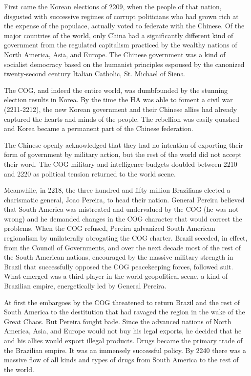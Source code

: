\documentclass[]{article}
\begin{document}
{First came the Korean elections of 2209, when the people of that nation, disgusted with successive regimes of corrupt politicians who had grown rich at the expense of the populace, actually voted to federate with the Chinese. Of the major countries of the world, only China had a significantly different kind of government from the regulated capitalism practiced by the wealthy nations of North America, Asia, and Europe. The Chinese government was a kind of socialist democracy based on the humanist principles espoused by the canonized twenty-second century Italian Catholic, St. Michael of Siena.

The COG, and indeed the entire world, was dumbfounded by the stunning election results in Korea. By the time the HA was able to foment a civil war (2211-2212), the new Korean government and their Chinese allies had already captured the hearts and minds of the people. The rebellion was easily quashed and Korea became a permanent part of the Chinese federation.

The Chinese openly acknowledged that they had no intention of exporting their form of government by military action, but the rest of the world did not accept their word. The COG military and intelligence budgets doubled between 2210 and 2220 as political tension returned to the world scene.

Meanwhile, in 2218, the three hundred and fifty million Brazilians elected a charismatic general, Joao Pereira, to head their nation. General Pereira believed that South America was mistreated and undervalued by the COG (he was not wrong) and he demanded changes in the COG character that would correct the problems. When the COG refused, Pereira galvanized South American regionalism by unilaterally abrogating the COG charter. Brazil seceded, in effect, from the Council of Governments, and over the next decade most of the rest of the South American nations, encouraged by the massive military strength in Brazil that successfully opposed the COG peacekeeping forces, followed suit. What emerged was a third player in the world geopolitical scene, a kind of Brazilian empire, energetically led by General Pereira.

At first the embargoes by the COG threatened to return Brazil and the rest of South America to the destitution that had ravaged the region in the wake of the Great Chaos. But Pereira fought bade. Since the advanced nations of North America, Asia, and Europe would not buy his legal exports, he decided that he and his allies would export illegal products. Drugs became the primary trade of the Brazilian empire. It was an immensely successful policy. By 2240 there was a massive flow of all kinds and types of drugs from South America to the rest of the world.

}
\end{document}
